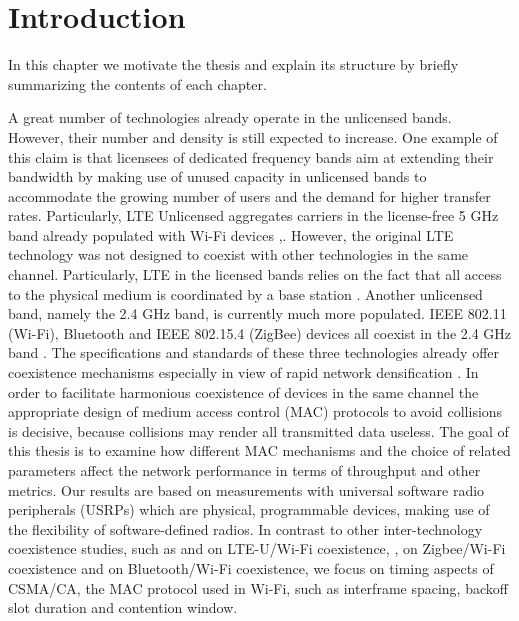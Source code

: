 \chapter{Introduction}
\label{ch:introduction}

In this chapter we motivate the thesis and explain its structure by briefly summarizing the contents of each chapter.

A great number of technologies already operate in the unlicensed bands. However, their number and density is still expected to increase. One example of this claim is that licensees of dedicated frequency bands aim at extending their bandwidth by making use of unused capacity in unlicensed bands to accommodate the growing number of users and the demand for higher transfer rates. Particularly, LTE Unlicensed aggregates carriers in the license-free 5 GHz band already populated with Wi-Fi devices \cite{nihtilä13},\cite{qualcomm15}. However, the original LTE technology was not designed to coexist with other technologies in the same channel. Particularly, LTE in the licensed bands relies on the fact that all access to the physical medium is coordinated by a base station \cite{ghosh10}. Another unlicensed band, namely the 2.4 GHz band, is currently much more populated. IEEE 802.11 (Wi-Fi), Bluetooth and IEEE 802.15.4 (ZigBee) devices all coexist in the 2.4 GHz band \cite{lee07}. The specifications and standards of these three technologies already offer coexistence mechanisms especially in view of rapid network densification \cite{bhushan14}. In order to facilitate harmonious coexistence of devices in the same channel the appropriate design of medium access control (MAC) protocols to avoid collisions is decisive, because collisions may render all transmitted data useless. The goal of this thesis is to examine how different MAC mechanisms and the choice of related parameters affect the network performance in terms of throughput and other metrics. Our results are based on measurements with universal software radio peripherals (USRPs) which are physical, programmable devices, making use of the flexibility of software-defined radios. In contrast to other inter-technology coexistence studies, such as \cite{gomezmiguelez16} and \cite{capretti16} on LTE-U/Wi-Fi coexistence, \cite{zhang11}, \cite{yi11} on Zigbee/Wi-Fi coexistence and \cite{chiasserini02} on Bluetooth/Wi-Fi coexistence, we focus on timing aspects of CSMA/CA, the MAC protocol used in Wi-Fi, such as interframe spacing, backoff slot duration and contention window.

